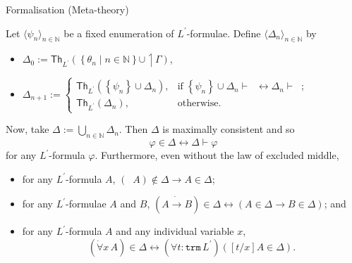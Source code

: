 \documentclass[serif,table,10pt]{beamer}
\newcommand{\IN}{\mathbb{N}}
\newcommand{\0}{\texttt{0}}
\newcommand{\1}{\texttt{1}}
\newcommand{\embed}[1]{{\upharpoonleft} {#1}}
\newcommand{\Lbot}{\mathop{\dot{\bot}}}
\newcommand{\Lneg}{\mathop{\dot{\neg}}}
\newcommand{\Lto}{\mathrel{\dot{\to}}}
\newcommand{\Lall}[1]{\dot{\forall}#1\,}
\begin{document}
\begin{frame}{Formalisation (Meta-theory)}

    Let $\langle\psi_n\rangle_{n \in \IN}$ be a fixed enumeration of $L^\prime$-formulae.
    Define $\langle \Delta_n \rangle_{n \in \IN}$ by
    \begin{itemize}
        \item $\Delta_0 := \mathsf{Th}_{L^\prime} (\left\{ \theta_n \mid n \in \IN \right\} \cup \embed{\Gamma})$,
        \item $\Delta_{n + 1} := \begin{cases} \mathsf{Th}_{L^\prime} ( \left\{ \psi_n \right\} \cup \Delta_n ) , & \mathrm{if} \; \left\{ \psi_n \right\} \cup \Delta_n \vdash \Lbot \leftrightarrow \Delta_n \vdash \Lbot ; \\ \mathsf{Th}_{L^\prime} ( \Delta_n ) , & \mathrm{otherwise} . \end{cases}$
    \end{itemize}
    Now, take $\Delta := \bigcup_{n\in\IN} \Delta_n$. 
    Then $\Delta$ is maximally consistent and so \[ \varphi \in \Delta \leftrightarrow \Delta \vdash \varphi \] for any $L^\prime$-formula $\varphi$.
    Furthermore, even without the law of excluded middle,
    \begin{itemize}
        \item for any $L^\prime$-formula $A $, $ ( \Lneg A ) \notin \Delta \to A \in \Delta $;
        \item for any $L^\prime$-formulae $A$ and $B$, $ ( A \Lto B ) \in \Delta \leftrightarrow ( A \in \Delta \to B \in \Delta ) $; and
        \item for any $L^\prime$-formula $A$ and any individual variable $x$, \[ ( \Lall{x} A ) \in \Delta \leftrightarrow (\forall t : \mathtt{trm} \, L^\prime) ( [t / x] A \in \Delta ) . \]
    \end{itemize}

\end{frame}
\end{document}
